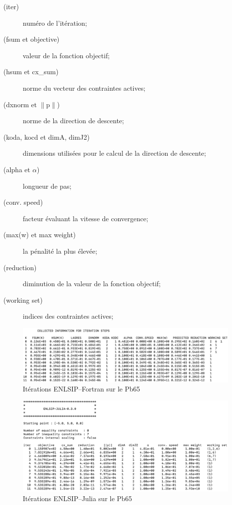 \begin{description}
    \item[(iter)] numéro de l'itération;
    \item[(fsum et objective)] valeur de la fonction objectif;
    \item[(hsum et cx\_sum)] norme du vecteur des contraintes actives; 
    \item[(dxnorm et $\|\text{p}\|$)] norme de la direction de descente; 
    \item[(koda, kocd et dimA, dimJ2)] dimensions utilisées pour le calcul de la direction de descente; 
    \item[(alpha et $\alpha$)] longueur de pas; 
    \item[(conv. speed)] facteur évaluant la vitesse de convergence; 
    \item[(max(w) et max weight)] la pénalité la plus élevée; 
    \item[(reduction)] diminution de la valeur de la fonction objectif; 
    \item[(working set)] indices des contraintes actives; 
\end{description}

\begin{figure}[ht]
    
    \includegraphics[scale=0.55]{FichiersSource/Images/sortie_f77_pb65}
    \caption{Itérations ENLSIP--Fortran sur le Pb65}
    \label{fig:iter fortran}
\end{figure}

\begin{figure}[ht]
    \includegraphics[scale=0.57]{FichiersSource/Images/sortie_pb65_julia}
    \caption{Itérations ENLSIP--Julia sur le Pb65}
    \label{fig:iter julia}
\end{figure}



